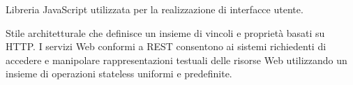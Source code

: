 
 {Libreria JavaScript utilizzata per la realizzazione di interfacce utente.}

 {Stile architetturale che definisce un insieme di vincoli e proprietà basati su HTTP. I servizi Web conformi a REST consentono ai sistemi richiedenti di accedere e manipolare rappresentazioni testuali delle risorse Web utilizzando un insieme di operazioni stateless uniformi e predefinite.}


